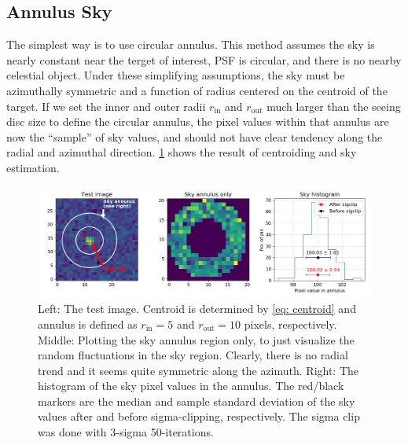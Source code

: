 \subsection{Annulus Sky}
The simplest way is to use circular annulus. This method assumes the sky is nearly constant near the terget of interest, PSF is circular, and there is no nearby celestial object. Under these simplifying assumptions, the sky must be azimuthally symmetric and a function of radius centered on the centroid of the target. If we set the inner and outer radii $ r_\mathrm{in} $ and $ r_\mathrm{out} $ much larger than the seeing disc size to define the circular annulus, the pixel values within that annulus are now the ``sample'' of sky values, and should not have clear tendency along the radial and azimuthal direction. \cref{fig:photapex02} shows the result of centroiding and sky estimation. 

\begin{figure} [ht!]
\centering
\includegraphics[width=\linewidth]{figs/phot_ap_ex02}
\caption{Left: The test image. Centroid is determined by \cref{eq: centroid} and annulus is defined as $ r_\mathrm{in} = 5 $ and $ r_\mathrm{out} = 10 $ pixels, respectively. Middle: Plotting the sky annulus region only, to just visualize the random fluctuations in the sky region. Clearly, there is no radial trend and it seems quite symmetric along the azimuth. Right: The histogram of the sky pixel values in the annulus. The red/black markers are the median and sample standard deviation of the sky values after and before sigma-clipping, respectively. The sigma clip was done with 3-sigma 50-iterations.}
\label{fig:photapex02}
\end{figure}

